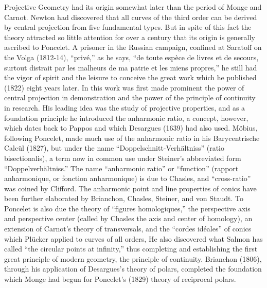 \documentclass[oneside]{book}
\begin{document}
{Projective Geometry had its origin somewhat later than the period of
Monge and Carnot. Newton had discovered that all curves of the third
order can be derived by central projection from five fundamental
types. But in spite of this fact the theory attracted so little
attention for over a century that its origin is generally ascribed
to Poncelet. A prisoner in the Russian campaign, confined at
Saratoff on the Volga (1812-14), ``priv\'e,'' as he says, ``de toute
esp\`ece de livres et de secours, surtout distrait par les
malheurs de ma patrie et les miens propres,'' he still had the vigor
of spirit and the leisure to conceive the great work which he
published (1822) eight years later. In this work was first made
prominent the power of central projection in demonstration and the
power of the principle of continuity in research. His leading idea
was the study of projective properties, and as a foundation
principle he introduced the anharmonic ratio, a concept, however,
which dates back to Pappos and which Desargues (1639) had also
used. M\"obius, following Poncelet, made much use of the anharmonic
ratio in his Barycentrische Calc\"ul (1827), but under the name
``Doppelschnitt-Verh\"altniss'' (ratio bisectionalis), a term now in
common use under Steiner's abbreviated form ``Doppelverh\"altniss.''
The name ``anharmonic ratio'' or ``function'' (rapport anharmonique,
or fonction anharmonique) is due to Chasles, and ``cross-ratio'' was
coined by Clifford. The anharmonic point and line properties of
conics have been further elaborated by Brianchon, Chasles, Steiner,
and von Staudt. To Poncelet is also due the theory of ``figures
homologiques,'' the perspective axis and perspective center (called
by Chasles the axis and center of homology), an extension of
Carnot's theory of transversals, and the ``cordes id\'eales'' of
conics which Pl\"ucker applied to curves of all orders, He also
discovered what Salmon has called ``the circular points at
infinity,'' thus completing and establishing the first great
principle of modern geometry, the principle of continuity. Brianchon
(1806), through his application of Desargues's theory of polars,
completed the foundation which Monge had begun for Poncelet's (1829)
theory of reciprocal polars.

}
\end{document}
